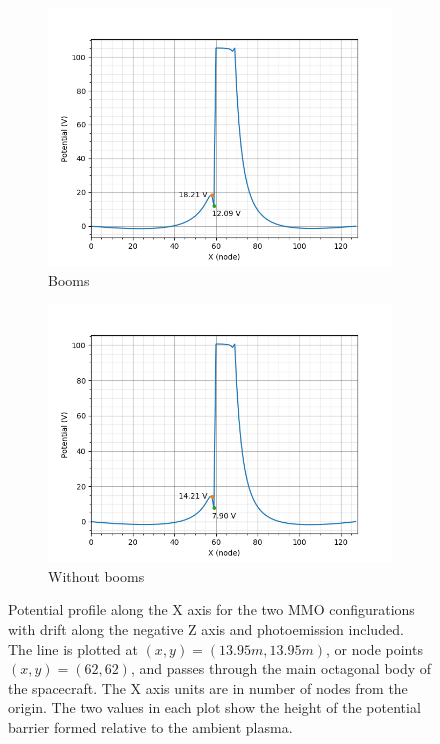 \begin{figure}[H]
  \begin{subfigure}[b]{0.6\textwidth}
  \includegraphics[width=\textwidth]{figures/MMO/minZ/WB/L_minZ_WB.png}
  \caption{Booms}
  \label{fig:L_minZ_WB}
\end{subfigure}
\begin{subfigure}[b]{0.6\textwidth}
  \includegraphics[width=\textwidth]{figures/MMO/minZ/NB/L_minZ_NB.png}
  \caption{Without booms}
  \label{fig:L_minZ_NB}
\end{subfigure}
\caption{Potential profile along the X axis for the two MMO configurations with drift along the negative Z axis and photoemission included. The line is plotted at $(x,y) = (13.95 m, 13.95 m)$, or node points $(x,y) = (62,62)$, and passes through the main octagonal body of the spacecraft. The X axis units are in number of nodes from the origin. The two values in each plot show the height of the potential barrier formed relative to the ambient plasma.}
\label{fig:Line_minZ}
\end{figure}

